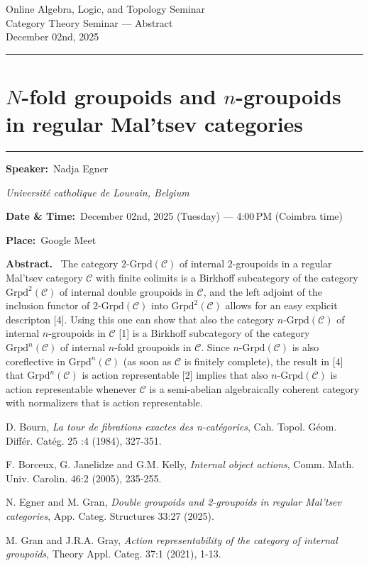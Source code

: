\documentclass[11pt,a4paper]{article}
\newcommand{\Title}[1]{\section*{#1}\vspace{-0.25em}\hrule\vspace{0.8em}}
\newcommand{\Field}[2]{\textbf{#1:}~#2\par}
\newcommand{\Affil}[1]{\textit{#1}\par}
\newcommand{\Abstract}{\vspace{0.6em}\textbf{Abstract.}~}
\begin{document}
	
	\begin{center}
		{\LARGE Online Algebra, Logic, and Topology Seminar}\\[0.25em]
		{\large Category Theory Seminar — Abstract}\\[0.5em]
		December 02nd, 2025
	\end{center}
	
	\vspace{1.25em}\hrule\vspace{1.25em}
	
	\Title{$ N $-fold groupoids and $ n $-groupoids in regular Mal'tsev categories}
	
	\Field{Speaker}{Nadja Egner}
	\Affil{\hspace{1.15cm}Universit\'{e} catholique de Louvain, Belgium}
	
	\noindent \Field{Date \& Time}{December 02nd, 2025 (Tuesday) — 4{:}00\,PM (Coimbra time)}
	\noindent \Field{Place}{Google Meet}
	
	\Abstract
	The category $ 2\textrm{-}\mathrm{Grpd}(\mathscr{C}) $ of internal $ 2 $-groupoids in a regular Mal’tsev category $ \mathscr{C} $ with finite colimits is a Birkhoff subcategory of the category $ \mathrm{Grpd}^2(\mathscr{C}) $ of internal double groupoids in $ \mathscr{C} $, and the left adjoint of the inclusion functor of $ 2\textrm{-}\mathrm{Grpd}(\mathscr{C}) $ into $ \mathrm{Grpd}^2(\mathscr{C}) $ allows for an easy explicit descripton [4]. Using this one can show that also the category $ n\textrm{-}\mathrm{Grpd}(\mathscr{C}) $ of internal $ n $-groupoids in $ \mathscr{C} $ [1] is a Birkhoff subcategory of the category $ \mathrm{Grpd}^n(\mathscr{C}) $ of internal $ n $-fold groupoids in $ \mathscr{C} $. Since $ n\textrm{-}\mathrm{Grpd}(\mathscr{C}) $ is also coreflective in $ \mathrm{Grpd}^n(\mathscr{C}) $ (as soon as $ \mathscr{C} $ is finitely complete), the result in [4] that $ \mathrm{Grpd}^n(\mathscr{C}) $ is action representable [2] implies that also $ n\textrm{-}\mathrm{Grpd}(\mathscr{C}) $ is action representable whenever $\mathscr{C}$ is a semi-abelian algebraically coherent category with normalizers that is action representable.
	
	\phantom{x}
	
	\noindent [1] D. Bourn, \textit{La tour de fibrations exactes des n-catégories}, Cah. Topol. Géom. Différ. Catég. 
	25 :4 (1984), 327-351. 
	
	\vspace{1mm}
	\noindent [2] F. Borceux, G. Janelidze and G.M. Kelly, \textit{Internal object actions}, Comm. Math. Univ. Carolin. 46:2 (2005), 235-255.
	
	\vspace{1mm}
	\noindent [3] N. Egner and M. Gran, \textit{Double groupoids and 2-groupoids in regular Mal'tsev categories}, App. Categ. Structures 33:27 (2025).
	
	\vspace{1mm}
	\noindent [4] M. Gran and J.R.A. Gray, \textit{Action representability of the category of internal groupoids}, Theory Appl. Categ. 37:1 (2021), 1-13.
\end{document}

